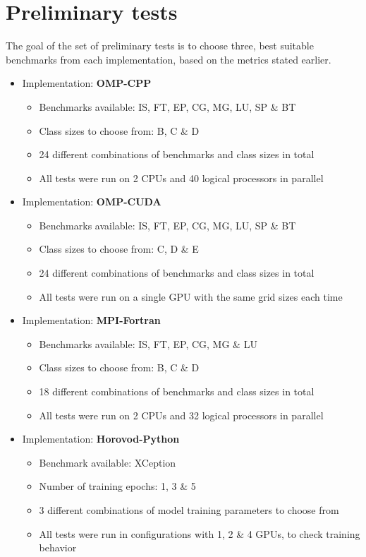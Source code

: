 \section{Preliminary tests}

The goal of the set of preliminary tests is to choose three, best suitable
benchmarks from each implementation, based on the metrics stated earlier.

\begin{itemize}
    \item Implementation: \textbf{OMP-CPP}
    \begin{itemize}
        \item Benchmarks available: IS, FT, EP, CG, MG, LU, SP \& BT
        \item Class sizes to choose from: B, C \& D
        \item 24 different combinations of benchmarks and class sizes in total
        \item All tests were run on 2 CPUs and 40 logical processors in parallel
    \end{itemize}
    \item Implementation: \textbf{OMP-CUDA}
    \begin{itemize}
        \item Benchmarks available: IS, FT, EP, CG, MG, LU, SP \& BT
        \item Class sizes to choose from: C, D \& E
        \item 24 different combinations of benchmarks and class sizes in total
        \item All tests were run on a single GPU with the same grid sizes each time
    \end{itemize}
    \item Implementation: \textbf{MPI-Fortran}
    \begin{itemize}
        \item Benchmarks available: IS, FT, EP, CG, MG \& LU
        \item Class sizes to choose from: B, C \& D
        \item 18 different combinations of benchmarks and class sizes in total
        \item All tests were run on 2 CPUs and 32 logical processors in parallel
    \end{itemize}
    \item Implementation: \textbf{Horovod-Python}
    \begin{itemize}
        \item Benchmark available: XCeption
        \item Number of training epochs: 1, 3 \& 5
        \item 3 different combinations of model training parameters to choose from
        \item All tests were run in configurations with 1, 2 \& 4 GPUs, to
        check training behavior
    \end{itemize}
\end{itemize}

